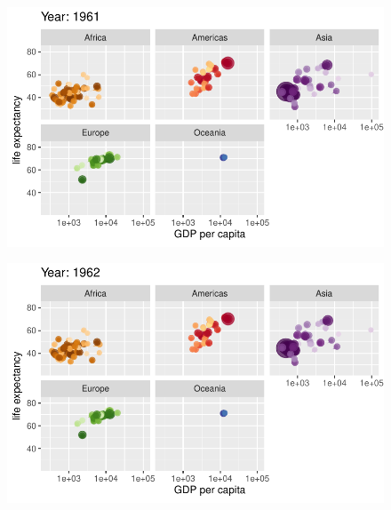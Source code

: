 \documentclass[
  letterpaper,
  DIV=11,
  numbers=noendperiod]{scrartcl}
\begin{document}
\begin{figure}[H]

{\centering \includegraphics{class05_files/figure-pdf/unnamed-chunk-24-18.pdf}

}

\end{figure}

\begin{figure}[H]

{\centering \includegraphics{class05_files/figure-pdf/unnamed-chunk-24-19.pdf}

}

\end{figure}
\end{document}
